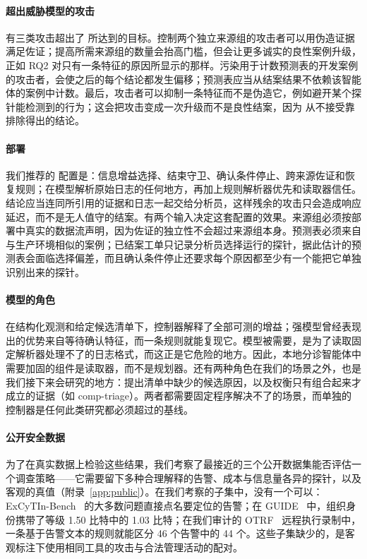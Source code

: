 \paragraph{超出威胁模型的攻击} 有三类攻击超出了 \hesp{} 所达到的目标。控制两个独立来源组的攻击者可以用伪造证据满足佐证；提高所需来源组的数量会抬高门槛，但会让更多诚实的良性案例升级，正如 RQ2 对只有一条特征的原因所显示的那样。污染用于计数预测表的开发案例的攻击者，会使之后的每个结论都发生偏移；预测表应当从结案结果不依赖该智能体的案例中计数。最后，攻击者可以抑制一条特征而不是伪造它，例如避开某个探针能检测到的行为；这会把攻击变成一次升级而不是良性结案，因为 \hesp{} 从不接受靠排除得出的结论。

\paragraph{部署} 我们推荐的 \hesp{} 配置是：信息增益选择、结束守卫、确认条件停止、跨来源佐证和恢复规则；在模型解析原始日志的任何地方，再加上规则解析器优先和读取器信任。结论应当连同所引用的证据和日志一起交给分析员，这样残余的攻击只会造成响应延迟，而不是无人值守的结案。有两个输入决定这套配置的效果。来源组必须按部署中真实的数据流声明，因为佐证的独立性不会超过来源组本身。预测表必须来自与生产环境相似的案例；已结案工单只记录分析员选择运行的探针，据此估计的预测表会面临选择偏差，而且确认条件停止还要求每个原因都至少有一个能把它单独识别出来的探针。

\paragraph{模型的角色} 在结构化观测和给定候选清单下，控制器解释了全部可测的增益；强模型曾经表现出的优势来自等待确认特征，而一条规则就能复现它。模型被需要，是为了读取固定解析器处理不了的日志格式，而这正是它危险的地方。因此，本地分诊智能体中需要加固的组件是读取器，而不是规划器。还有两种角色在我们的场景之外，也是我们接下来会研究的地方：提出清单中缺少的候选原因，以及权衡只有组合起来才成立的证据（如 comp-triage）。两者都需要固定程序解决不了的场景，而单独的控制器是任何此类研究都必须超过的基线。

\paragraph{公开安全数据}\label{sec:realdata} 为了在真实数据上检验这些结果，我们考察了最接近的三个公开数据集能否评估一个调查策略——它需要留下多种合理解释的告警、成本与信息量各异的探针，以及客观的真值（附录~\ref{app:public}）。在我们考察的子集中，没有一个可以：ExCyTIn-Bench~\citep{excytin} 的大多数问题直接点名要定位的告警；在 GUIDE~\citep{guide} 中，组织身份携带了等级 1.50 比特中的 1.03 比特；在我们审计的 OTRF~\citep{otrf} 远程执行录制中，一条基于告警文本的规则就能区分 46 个告警中的 44 个。这些子集缺少的，是客观标注下使用相同工具的攻击与合法管理活动的配对。
